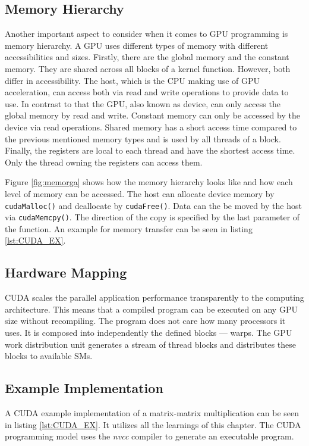     
\subsection{Memory Hierarchy}
\label{subsec:MemHi}
  Another important aspect to consider when it comes to GPU programming is memory hierarchy.
  A GPU uses different types of memory with different accessibilities and sizes.
  Firstly, there are the global memory and the constant memory.
  They are shared across all blocks of a kernel function.
  However, both differ in accessibility.
  The host, which is the CPU making use of GPU acceleration, can access both via read and write operations to provide data to use.
  In contrast to that the GPU, also known as device, can only access the global memory by read and write.
  Constant memory can only be accessed by the device via read operations.
  Shared memory has a short access time compared to the previous mentioned memory types and is used by all threads of a block.
  Finally, the registers are local to each thread and have the shortest access time.
  Only the thread owning the registers can access them.~\cite{Rauber.2012}~\cite{Huang.2008}
     
  Figure \ref{fig:memorga} shows how the memory hierarchy looks like and how each level of memory can be accessed.
  The host can allocate device memory by \texttt{cudaMalloc()} and deallocate by \texttt{cudaFree()}.
  Data can the be moved by the host via \texttt{cudaMemcpy()}.
  The direction of the copy is specified by the last parameter of the function.
  An example for memory transfer can be seen in listing \ref{lst:CUDA_EX}.
  
  
      
\subsection{Hardware Mapping}
  CUDA scales the parallel application performance transparently to the computing architecture.
  This means that a compiled program can be executed on any GPU size without recompiling.
  The program does not care how many processors it uses.
  It is composed into independently the defined blocks --- warps.
  The GPU work distribution unit generates a stream of thread blocks and distributes these blocks to available SMs.~\cite{Lindholm.2008}~\cite{NVIDIA.2019}
  
\subsection{Example Implementation}
  A CUDA example implementation of a matrix-matrix multiplication can be seen in listing \ref{lst:CUDA_EX}.
  It utilizes all the learnings of this chapter.
  The CUDA programming model uses the \textit{nvcc} compiler to generate an executable program.

